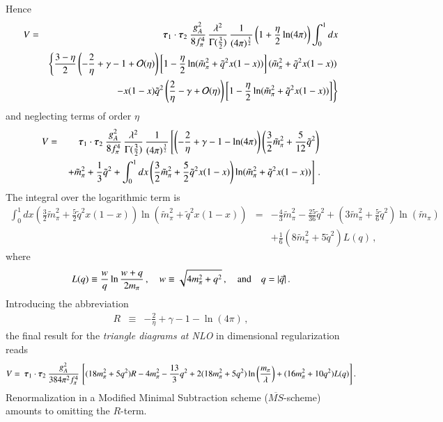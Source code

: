 \documentclass[sort&compress,preprint,3p]{elsarticle}
\newcommand{\bbox}[1]{\mbox{\boldmath $#1$}}
\begin{document}
Hence
%
\begin{eqnarray}
V &=&
\: \bbox{\tau}_1 \cdot \bbox{\tau}_2 \:
\frac{g_A^2}{8 f_\pi^4} \,
\frac{\lambda^{2}}{\Gamma(\frac 3 2)} \,
\frac{1}{(4 \pi)^{\frac{3}{2}}} \left(1+\frac{\eta}{2} \ln(4\pi)\right)
\int_0^1 dx 
\nonumber \\ && 
\left\{ \frac{3-\eta}{2}
\left( -\frac 2 \eta + \gamma -1 + {\cal O}(\eta) \right)
\left[1-\frac{\eta}{2} \ln(\tilde{m}_\pi^2 + \tilde{q}^2 x (1-x))\right]
(\tilde{m}_\pi^2 + \tilde{q}^2 x (1-x))
\right. \nonumber \\ && \left.
-x(1-x)\tilde{q}^2
\left( \frac 2 \eta - \gamma + {\cal O}(\eta) \right)
\left[ 1-\frac{\eta}{2} \ln(\tilde{m}_\pi^2 + \tilde{q}^2 x (1-x)) \right]
\right\}
\end{eqnarray}
%
and neglecting terms of order $\eta$
%
\begin{eqnarray}
V &=&
\: \bbox{\tau}_1 \cdot \bbox{\tau}_2 \:
\frac{g_A^2}{8 f_\pi^4} \,
\frac{\lambda^{2}}{\Gamma(\frac 3 2)} \,
\frac{1}{(4 \pi)^{\frac{3}{2}}} 
\left[
\left( -\frac 2 \eta +\gamma -1 -\ln (4\pi) \right)
\left(\frac 3 2 \tilde{m}_\pi^2 +\frac{5}{12} \tilde{q}^2 \right)
\right. \nonumber \\ && \left.
+ \tilde m_\pi^2 +\frac 1 3 \tilde{q}^2  
+\int_0^1 dx 
\left (\frac 3 2 \tilde{m}_\pi^2 + \frac 5 2\tilde{q}^2 x (1-x) \right)
\ln(\tilde{m}_\pi^2 + \tilde{q}^2 x (1-x))
\right]
\,.
\end{eqnarray}
%
The integral over the logarithmic term is
%
\begin{eqnarray}
\int_0^1 dx 
\left (\frac 3 2 \tilde{m}_\pi^2 + \frac 5 2\tilde{q}^2 x (1-x) \right)
\ln(\tilde{m}_\pi^2 + \tilde{q}^2 x (1-x)) & = &
-\frac 4 3 \tilde{m}_\pi^2 - \frac{25}{36} \tilde q^2 +
\left(3 \tilde m_\pi^2+ \frac 5 6 \tilde q^2 \right) \ln (\tilde m_\pi) 
\nonumber \\ && 
 + \frac 1 6 (8 \tilde m_\pi^2+ 5 \tilde q^2 ) L(q)
\,,
\end{eqnarray}
where
\begin{equation} 
L(q)  \equiv  {w\over q} \ln {w+q \over 2m_\pi} \,,
\quad
 w  \equiv  \sqrt{4m_\pi^2+q^2} \,,
 \quad \mbox{and} \quad
 q=|\vec q| \,.
\label{eq_L}
\end{equation}
%
Introducing the abbreviation
\begin{eqnarray}
R &\equiv& 
-\frac{2}{\eta} + \gamma-1-\ln(4\pi)
\,,
\label{eq_R}
\end{eqnarray}
the final result for the {\it triangle diagrams at NLO} in dimensional
regularization reads
%
\begin{equation}
V =
\: \bbox{\tau}_1 \cdot \bbox{\tau}_2 \:
\frac{g_A^2}{384 \pi^2 f_\pi^4} \,
\left[
(18 m_\pi^2 +5 q^2 ) R
-4 m_\pi^2 - \frac{13}{3} q^2 +
2(18 m_\pi^2 +5 q^2 ) \ln \left(\frac{m_\pi}{\lambda} \right) +
(16 m_\pi^2+10 q^2 ) L(q)
\right] .
\label{eq_triangles}
\end{equation}
Renormalization in a Modified Minimal Subtraction scheme 
($\overline{MS}$-scheme)~\cite{Col84}
amounts to omitting the $R$-term.
\end{document}
